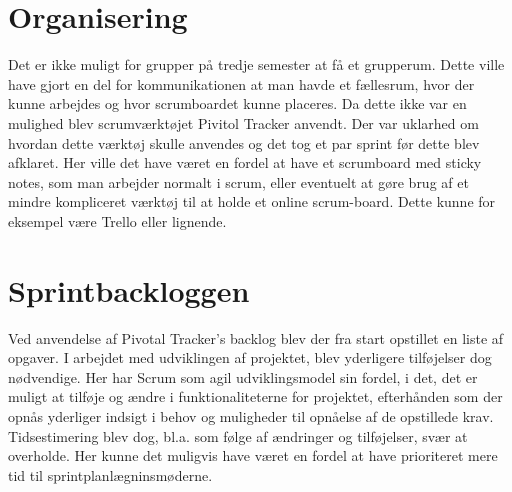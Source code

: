\section{Organisering}
Det er ikke muligt for grupper på tredje semester at få et grupperum. Dette ville have gjort en del for kommunikationen at man havde et fællesrum, hvor der kunne arbejdes og hvor scrumboardet kunne placeres. Da dette ikke var en mulighed blev scrumværktøjet Pivitol Tracker anvendt. Der var uklarhed om hvordan dette værktøj skulle anvendes og det tog et par sprint før dette blev afklaret. Her ville det have været en fordel at have et scrumboard med sticky notes, som man arbejder normalt i scrum, eller eventuelt at gøre brug af et mindre kompliceret værktøj til at holde et online scrum-board. Dette kunne for eksempel være Trello eller lignende. 

\section{Sprintbackloggen}
Ved anvendelse af Pivotal Tracker's backlog blev der fra start opstillet en liste af opgaver. I arbejdet med udviklingen af projektet, blev yderligere tilføjelser dog nødvendige. Her har Scrum som agil udviklingsmodel sin fordel, i det, det er muligt at tilføje og ændre i funktionaliteterne for projektet, efterhånden som der opnås yderliger indsigt i behov og muligheder til opnåelse af de opstillede krav. Tidsestimering blev dog, bl.a. som følge af ændringer og tilføjelser, svær at overholde. Her kunne det muligvis have været en fordel at have prioriteret mere tid til sprintplanlægninsmøderne. 




